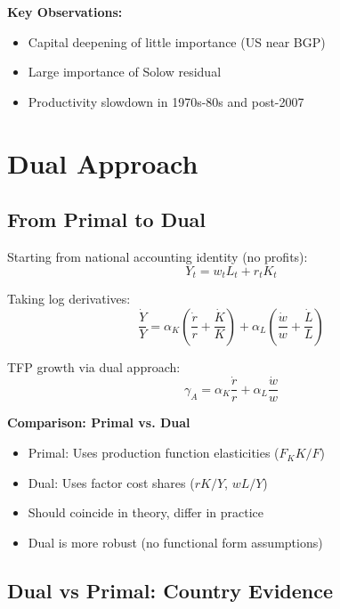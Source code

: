 \documentclass[a4paper,11pt]{article}
\newcommand{\gammaA}{\gamma_A}
\begin{document}
\begin{resultbox}
\textbf{Key Observations:}
\begin{itemize}
    \item Capital deepening of little importance (US near BGP)
    \item Large importance of Solow residual
    \item Productivity slowdown in 1970s-80s and post-2007
\end{itemize}
\end{resultbox}

\section{Dual Approach}

\subsection*{From Primal to Dual}

Starting from national accounting identity (no profits):
\[
Y_t = w_t L_t + r_t K_t
\]

Taking log derivatives:
\[
\frac{\dot{Y}}{Y} = \alpha_K\left(\frac{\dot{r}}{r} + \frac{\dot{K}}{K}\right) + \alpha_L\left(\frac{\dot{w}}{w} + \frac{\dot{L}}{L}\right)
\tag{Dual-Accounting}
\]

TFP growth via dual approach:
\[
\boxed{\gammaA = \alpha_K \frac{\dot{r}}{r} + \alpha_L \frac{\dot{w}}{w}}
\tag{Dual-TFP}
\]

\begin{resultbox}
\textbf{Comparison: Primal vs. Dual}

\begin{itemize}
    \item Primal: Uses production function elasticities ($F_K K/F$)
    \item Dual: Uses factor cost shares ($rK/Y$, $wL/Y$)
    \item Should coincide in theory, differ in practice
    \item Dual is more robust (no functional form assumptions)
\end{itemize}
\end{resultbox}

\subsection*{Dual vs Primal: Country Evidence}
\end{document}
